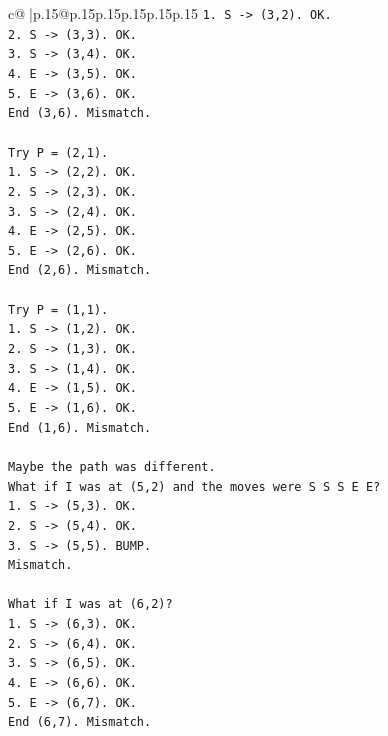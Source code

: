 \documentclass{article}
\begin{document}
{\begin{supertabular}{c@{$\;$}|p{.15\linewidth}@{}p{.15\linewidth}p{.15\linewidth}p{.15\linewidth}p{.15\linewidth}p{.15\linewidth}}
{{{\texttt{1. S {-}> (3,2). OK.} \\
\texttt{2. S {-}> (3,3). OK.} \\
\texttt{3. S {-}> (3,4). OK.} \\
\texttt{4. E {-}> (3,5). OK.} \\
\texttt{5. E {-}> (3,6). OK.} \\
\texttt{End (3,6). Mismatch.} \\
\\ 
\texttt{Try P = (2,1).} \\
\texttt{1. S {-}> (2,2). OK.} \\
\texttt{2. S {-}> (2,3). OK.} \\
\texttt{3. S {-}> (2,4). OK.} \\
\texttt{4. E {-}> (2,5). OK.} \\
\texttt{5. E {-}> (2,6). OK.} \\
\texttt{End (2,6). Mismatch.} \\
\\ 
\texttt{Try P = (1,1).} \\
\texttt{1. S {-}> (1,2). OK.} \\
\texttt{2. S {-}> (1,3). OK.} \\
\texttt{3. S {-}> (1,4). OK.} \\
\texttt{4. E {-}> (1,5). OK.} \\
\texttt{5. E {-}> (1,6). OK.} \\
\texttt{End (1,6). Mismatch.} \\
\\ 
\texttt{Maybe the path was different.} \\
\texttt{What if I was at (5,2) and the moves were S S S E E?} \\
\texttt{1. S {-}> (5,3). OK.} \\
\texttt{2. S {-}> (5,4). OK.} \\
\texttt{3. S {-}> (5,5). BUMP.} \\
\texttt{Mismatch.} \\
\\ 
\texttt{What if I was at (6,2)?} \\
\texttt{1. S {-}> (6,3). OK.} \\
\texttt{2. S {-}> (6,4). OK.} \\
\texttt{3. S {-}> (6,5). OK.} \\
\texttt{4. E {-}> (6,6). OK.} \\
\texttt{5. E {-}> (6,7). OK.} \\
\texttt{End (6,7). Mismatch.} \\
}}}
\end{supertabular}}
\end{document}
